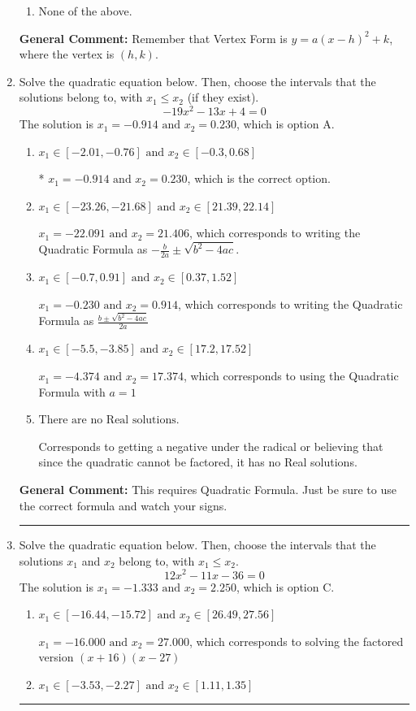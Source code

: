\documentclass{extbook}[14pt]
\newcommand{\litem}[1]{\item #1

\rule{\textwidth}{0.4pt}}
\begin{document}
\begin{enumerate}
{\begin{enumerate}[label=\Alph*.]
\begin{multicols}{2}
\end{multicols}\item None of the above.\end{enumerate}
\textbf{General Comment:} Remember that Vertex Form is $y = a(x-h)^2+k$, where the vertex is $(h, k)$.
}
\litem{
Solve the quadratic equation below. Then, choose the intervals that the solutions belong to, with $x_1 \leq x_2$ (if they exist).
\[ -19x^{2} -13 x + 4 = 0 \]The solution is \( x_1 = -0.914 \text{ and } x_2 = 0.230 \), which is option A.\begin{enumerate}[label=\Alph*.]
\item \( x_1 \in [-2.01, -0.76] \text{ and } x_2 \in [-0.3, 0.68] \)

* $x_1 = -0.914 \text{ and } x_2 = 0.230$, which is the correct option.
\item \( x_1 \in [-23.26, -21.68] \text{ and } x_2 \in [21.39, 22.14] \)

 $x_1 = -22.091 \text{ and } x_2 = 21.406$, which corresponds to writing the Quadratic Formula as $-\frac{b}{2a} \pm \sqrt{b^2 - 4ac}$.
\item \( x_1 \in [-0.7, 0.91] \text{ and } x_2 \in [0.37, 1.52] \)

 $x_1 = -0.230 \text{ and } x_2 = 0.914$, which corresponds to writing the Quadratic Formula as $\frac{b \pm \sqrt{b^2 - 4ac}}{2a}$
\item \( x_1 \in [-5.5, -3.85] \text{ and } x_2 \in [17.2, 17.52] \)

 $x_1 = -4.374 \text{ and } x_2 = 17.374$, which corresponds to using the Quadratic Formula with $a=1$
\item \( \text{There are no Real solutions.} \)

Corresponds to getting a negative under the radical or believing that since the quadratic cannot be factored, it has no Real solutions.
\end{enumerate}

\textbf{General Comment:} This requires Quadratic Formula. Just be sure to use the correct formula and watch your signs.
}
\litem{
Solve the quadratic equation below. Then, choose the intervals that the solutions $x_1$ and $x_2$ belong to, with $x_1 \leq x_2$.
\[ 12x^{2} -11 x -36 = 0 \]The solution is \( x_1 = -1.333 \text{ and } x_2 = 2.250 \), which is option C.\begin{enumerate}[label=\Alph*.]
\item \( x_1 \in [-16.44, -15.72] \text{ and } x_2 \in [26.49, 27.56] \)

$x_1 = -16.000 \text{ and } x_2 = 27.000$, which corresponds to solving the factored version $(x + 16)(x -27)$
\item \( x_1 \in [-3.53, -2.27] \text{ and } x_2 \in [1.11, 1.35] \)


\end{enumerate}}
\end{enumerate}
\end{document}
